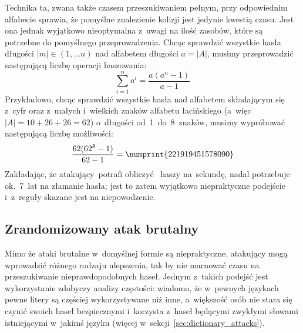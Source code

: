 Technika ta, zwana także czasem przeszukiwaniem pełnym, przy odpowiednim
alfabecie sprawia, że pomyślne znalezienie kolizji jest jedynie kwestią czasu.
Jest ona jednak wyjątkowo nieoptymalna z~uwagi na ilość zasobów, które są
potrzebne do pomyślnego przeprowadzenia. Chcąc sprawdzić wszystkie hasła
długości \mbox{$|m| \in (1, \ldots n)$} nad alfabetem długości $a=|A|$, musimy
przeprowadzić następującą liczbę operacji haszowania:
    $$\sum_{i=1}^n a^i = \frac{a(a^n-1)}{a-1}$$
Przykładowo, chcąc sprawdzić wszystkie hasła nad alfabetem składającym się
z~cyfr oraz z~małych i~wielkich znaków alfabetu łacińskiego (a~więc $|A| =
10+26+26 = 62$) o~długości od~1~do~8~znaków, musimy wypróbować następującą
liczbę możliwości:
    $$\frac{62(62^8-1)}{62-1} = \numprint{221919451578090}$$
Zakładając, że atakujący~potrafi obliczyć ~haszy na~sekundę,
nadal potrzebuje ok.~7~lat na złamanie hasła; jest to zatem wyjątkowo
niepraktyczne podejście i~z~reguły skazane jest na niepowodzenie.



\subsection{Zrandomizowany atak brutalny}
Mimo że ataki brutalne w~domyślnej formie są niepraktyczne, atakujący mogą
wprowadzić różnego rodzaju ulepszenia, tak by nie marnować czasu na
przeszukiwanie nieprawdopodobnych haseł. Jednym z~takich podejść jest
wykorzystanie zdobyczy analizy częstości: wiadomo, że w~pewnych językach pewne
litery są częściej wykorzystywane niż inne, a~większość osób nie stara się
czynić swoich haseł bezpiecznymi i~korzysta z~haseł będącymi zwykłymi słowami
istniejącymi w~jakimś języku (więcej w~sekcji~\ref{sec:dictionary_attacks}).

